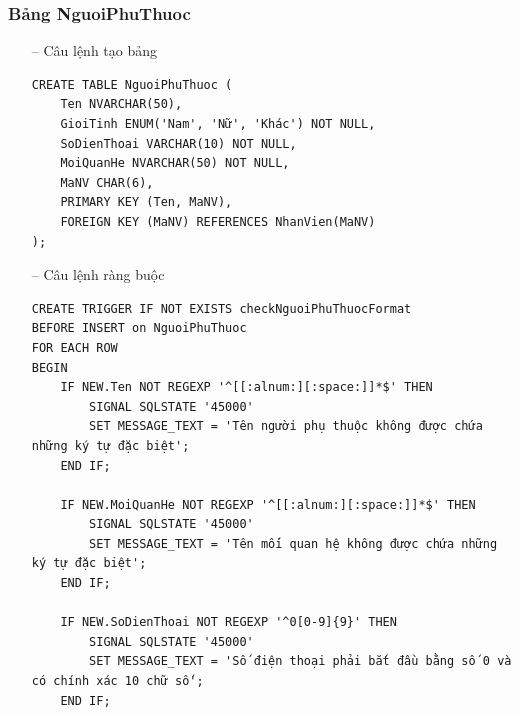 \subsubsection{Bảng NguoiPhuThuoc}
\begin{itemize}
    \item [--] Câu lệnh tạo bảng
   \begin{verbatim}
CREATE TABLE NguoiPhuThuoc (
    Ten NVARCHAR(50),
    GioiTinh ENUM('Nam', 'Nữ', 'Khác') NOT NULL,
    SoDienThoai VARCHAR(10) NOT NULL,
    MoiQuanHe NVARCHAR(50) NOT NULL,
    MaNV CHAR(6),
    PRIMARY KEY (Ten, MaNV),
    FOREIGN KEY (MaNV) REFERENCES NhanVien(MaNV)
);
    \end{verbatim}
    \newpage
    \item [--] Câu lệnh ràng buộc
    \begin{verbatim}
CREATE TRIGGER IF NOT EXISTS checkNguoiPhuThuocFormat
BEFORE INSERT on NguoiPhuThuoc
FOR EACH ROW
BEGIN
    IF NEW.Ten NOT REGEXP '^[[:alnum:][:space:]]*$' THEN 
        SIGNAL SQLSTATE '45000'
        SET MESSAGE_TEXT = 'Tên người phụ thuộc không được chứa những ký tự đặc biệt';
    END IF;

    IF NEW.MoiQuanHe NOT REGEXP '^[[:alnum:][:space:]]*$' THEN 
        SIGNAL SQLSTATE '45000'
        SET MESSAGE_TEXT = 'Tên mối quan hệ không được chứa những ký tự đặc biệt';
    END IF;

    IF NEW.SoDienThoai NOT REGEXP '^0[0-9]{9}' THEN
        SIGNAL SQLSTATE '45000'
        SET MESSAGE_TEXT = 'Số điện thoại phải bắt đầu bằng số 0 và có chính xác 10 chữ số';
    END IF;


\end{verbatim}
\end{itemize}
